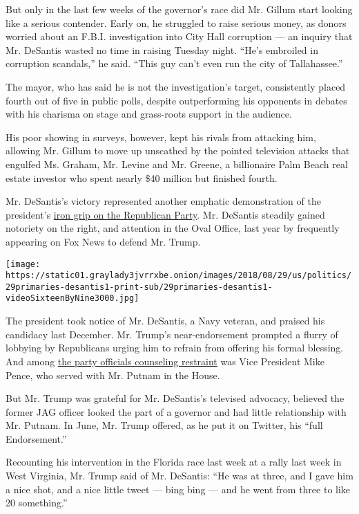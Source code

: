But only in the last few weeks of the governor's race did Mr. Gillum
start looking like a serious contender. Early on, he struggled to raise
serious money, as donors worried about an F.B.I. investigation into City
Hall corruption --- an inquiry that Mr. DeSantis wasted no time in
raising Tuesday night. ``He's embroiled in corruption scandals,'' he
said. ``This guy can't even run the city of Tallahassee.''

The mayor, who has said he is not the investigation's target,
consistently placed fourth out of five in public polls, despite
outperforming his opponents in debates with his charisma on stage and
grass-roots support in the audience.

His poor showing in surveys, however, kept his rivals from attacking
him, allowing Mr. Gillum to move up unscathed by the pointed television
attacks that engulfed Ms. Graham, Mr. Levine and Mr. Greene, a
billionaire Palm Beach real estate investor who spent nearly \$40
million but finished fourth.

Mr. DeSantis's victory represented another emphatic demonstration of the
president's
\href{https://www.nytimes3xbfgragh.onion/2018/08/27/us/politics/trump-endorsements.html}{iron
grip on the Republican Party}. Mr. DeSantis steadily gained notoriety on
the right, and attention in the Oval Office, last year by frequently
appearing on Fox News to defend Mr. Trump.

\texttt{[image: https://static01.graylady3jvrrxbe.onion/images/2018/08/29/us/politics/29primaries-desantis1-print-sub/29primaries-desantis1-videoSixteenByNine3000.jpg]}

The president took notice of Mr. DeSantis, a Navy veteran, and praised
his candidacy last December. Mr. Trump's near-endorsement prompted a
flurry of lobbying by Republicans urging him to refrain from offering
his formal blessing. And among
\href{https://www.nytimes3xbfgragh.onion/2018/05/14/us/politics/pence-trump-midterms.html}{the
party officials counseling restraint} was Vice President Mike Pence, who
served with Mr. Putnam in the House.

But Mr. Trump was grateful for Mr. DeSantis's televised advocacy,
believed the former JAG officer looked the part of a governor and had
little relationship with Mr. Putnam. In June, Mr. Trump offered, as he
put it on Twitter, his ``full Endorsement.''

Recounting his intervention in the Florida race last week at a rally
last week in West Virginia, Mr. Trump said of Mr. DeSantis: ``He was at
three, and I gave him a nice shot, and a nice little tweet --- bing bing
--- and he went from three to like 20 something.''

